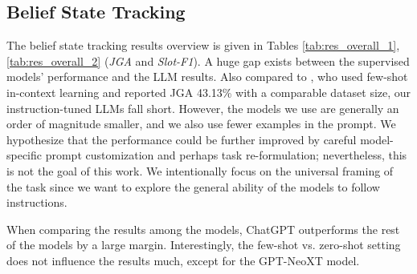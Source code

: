 \subsection{Belief State Tracking}
\label{subsec:dst}
The belief state tracking results overview is given in Tables \ref{tab:res_overall_1},\ref{tab:res_overall_2} (\emph{JGA} and \emph{Slot-F1}).
A huge gap exists between the supervised models' performance and the LLM results.
Also compared to \citet{hu-etal-2022-context}, who used few-shot in-context learning and reported JGA 43.13\% with a comparable dataset size, our instruction-tuned LLMs fall short.
However, the models we use are generally an order of magnitude smaller, and we also use fewer examples in the prompt.
We hypothesize that the performance could be further improved by careful model-specific prompt customization and perhaps task re-formulation; nevertheless, this is not the goal of this work.
We intentionally focus on the universal framing of the task since we want to explore the general ability of the models to follow instructions.

When comparing the results among the models, ChatGPT outperforms the rest of the models by a large margin. 
Interestingly, the few-shot vs. zero-shot setting does not influence the results much, except for the GPT-NeoXT model.

